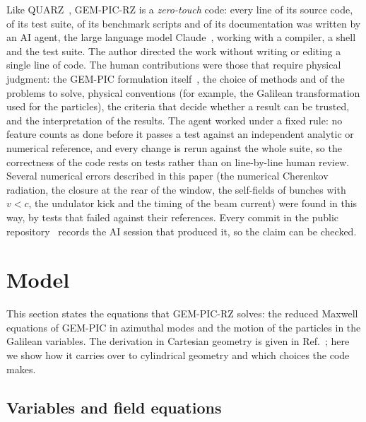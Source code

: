 \documentclass[aps,prab,reprint,floatfix,superscriptaddress,amsmath,amssymb]{revtex4-2}
\begin{document}
Like QUARZ~\cite{QUARZ}, GEM-PIC-RZ is a \emph{zero-touch} code: every line of its source code, of its test suite, of its benchmark scripts and of its documentation was written by an AI agent, the large language model Claude~\cite{Claude}, working with a compiler, a shell and the test suite. The author directed the work without writing or editing a single line of code. The human contributions were those that require physical judgment: the GEM-PIC formulation itself~\cite{GEMPIC}, the choice of methods and of the problems to solve, physical conventions (for example, the Galilean transformation used for the particles), the criteria that decide whether a result can be trusted, and the interpretation of the results. The agent worked under a fixed rule: no feature counts as done before it passes a test against an independent analytic or numerical reference, and every change is rerun against the whole suite, so the correctness of the code rests on tests rather than on line-by-line human review. Several numerical errors described in this paper (the numerical Cherenkov radiation, the closure at the rear of the window, the self-fields of bunches with $v < c$, the undulator kick and the timing of the beam current) were found in this way, by tests that failed against their references. Every commit in the public repository~\cite{GEMPICRZ} records the AI session that produced it, so the claim can be checked.

\section{Model}\label{sec:model}

This section states the equations that GEM-PIC-RZ solves: the reduced Maxwell equations of GEM-PIC in azimuthal modes and the motion of the particles in the Galilean variables. The derivation in Cartesian geometry is given in Ref.~\cite{GEMPIC}; here we show how it carries over to cylindrical geometry and which choices the code makes.

\subsection{Variables and field equations}
\end{document}

